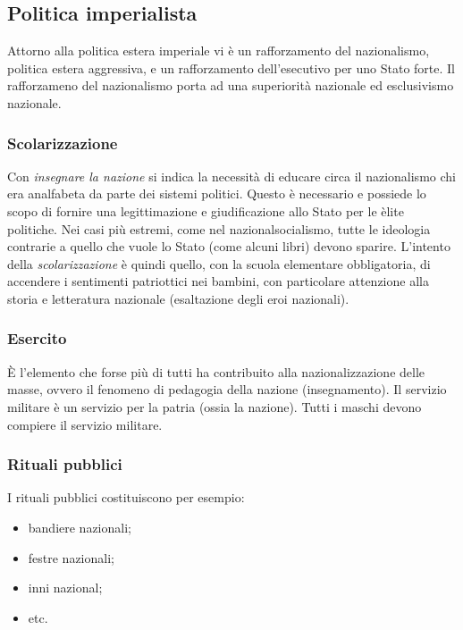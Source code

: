 \documentclass[a4paper]{article}
\begin{document}
\subsection{Politica imperialista}

Attorno alla politica estera imperiale vi è un rafforzamento del nazionalismo,
politica estera aggressiva, e un rafforzamento dell'esecutivo per uno Stato forte.
Il rafforzameno del nazionalismo porta ad una superiorità nazionale ed
esclusivismo nazionale.

\subsubsection{Scolarizzazione}

Con \textit{insegnare la nazione} si indica la necessità di educare circa il nazionalismo
chi era analfabeta da parte dei sistemi politici.
Questo è necessario e possiede lo scopo di fornire una legittimazione e
giudificazione allo Stato per le èlite politiche.
Nei casi più estremi, come nel nazionalsocialismo, tutte le ideologia
contrarie a quello che vuole lo Stato (come alcuni libri) devono sparire.
L'intento della \textit{scolarizzazione} è quindi quello,
con la scuola elementare obbligatoria, di accendere i sentimenti patriottici nei bambini,
con particolare attenzione alla storia e letteratura nazionale (esaltazione degli eroi nazionali).

\subsubsection{Esercito}

È l'elemento che forse più di tutti ha contribuito alla nazionalizzazione delle masse,
ovvero il fenomeno di pedagogia della nazione (insegnamento).
Il servizio militare è un servizio per la patria (ossia la nazione).
Tutti i maschi devono compiere il servizio militare.

\subsubsection{Rituali pubblici}

I rituali pubblici costituiscono per esempio:
\begin{itemize}
    \item bandiere nazionali;
    \item festre nazionali;
    \item inni nazional;
    \item etc.
\end{itemize}
\end{document}
